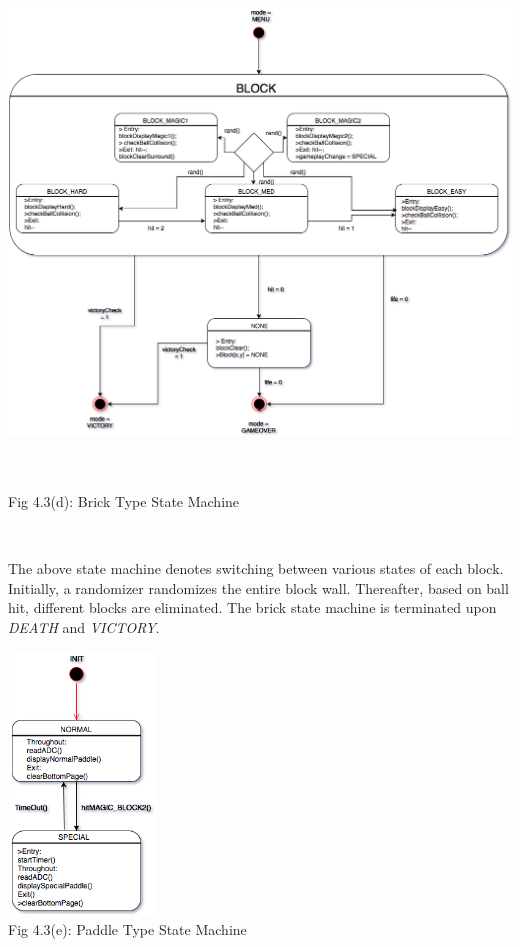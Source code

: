 \documentclass[a4paper,12pt,oneside]{book}
\begin{document}
\begin{center}
\includegraphics[width=14cm, height=14cm]{BreakoutImages/brickTypeStatemachine} \\
\caption{Fig 4.3(d): Brick Type State Machine} \\
\end{center}
\qquad The above state machine denotes switching between various states of each block. Initially, a randomizer randomizes the entire block wall. Thereafter, based on ball hit, different blocks are eliminated. The brick state machine is terminated upon \textit{DEATH} and \textit{VICTORY}.
\begin{center}
\includegraphics[width=4cm, height=7cm]{BreakoutImages/paddleTypeStateMachine} \\
\caption{Fig 4.3(e): Paddle Type State Machine} \\
\end{center}
\end{document}
